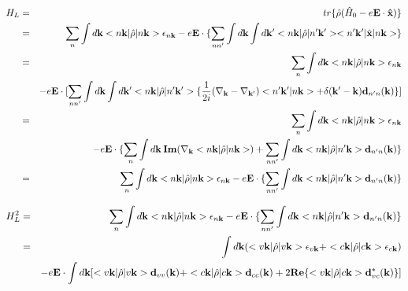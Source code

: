 \documentclass[aps,prb,preprint]{revtex4-1}
\begin{document}
\begin{appendix}
 \begin{eqnarray}
H_L &=& tr\{\hat{\rho}( \hat{H}_0 -e{\bf E \cdot \hat{x}}) \} \nonumber \\
&=& \sum_n \int d{\bf k} <n{\bf k}| \hat{\rho} |n{\bf k}> \epsilon_{n{\bf k}} - e{\bf E} \cdot \{ \sum_{nn'} \int d{\bf k} \int d{\bf k'} <n{\bf k}| \hat{\rho} |n'{\bf k'}><n'{\bf k'}| \hat{\bf x} |n{\bf k}> \} \nonumber \\
&=& \sum_n \int d{\bf k} <n{\bf k}| \hat{\rho} |n{\bf k}> \epsilon_{n{\bf k}} \nonumber \\
&& - e{\bf E} \cdot [ \sum_{nn'} \int d{\bf k} \int d{\bf k'} <n{\bf k}| \hat{\rho} |n'{\bf k'}> \{ \frac{1}{2i}(\nabla_{\bf k}-\nabla_{\bf k'}) <n'{\bf k'}|n{\bf k}> + \delta({\bf k'-k}) {\bf d}_{n'n}({\bf k})\} ]\nonumber \\
&=& \sum_n \int d{\bf k} <n{\bf k}| \hat{\rho} |n{\bf k}> \epsilon_{n{\bf k}} \nonumber \\
&& - e{\bf E} \cdot \{ \sum_{n} \int d{\bf k} \:{\bf Im}( \nabla_{\bf k}  <n{\bf k}| \hat{\rho} |n{\bf k}> ) + \sum_{nn'} \int d{\bf k} <n{\bf k}| \hat{\rho} |n'{\bf k}> {\bf d}_{n'n}({\bf k})\} \nonumber \\
&=& \sum_n \int d{\bf k} <n{\bf k}| \hat{\rho} |n{\bf k}> \epsilon_{n{\bf k}} - e{\bf E} \cdot \{ \sum_{nn'} \int d{\bf k} <n{\bf k}| \hat{\rho} |n'{\bf k}> {\bf d}_{n'n}({\bf k})\} 
\end{eqnarray}

 \begin{eqnarray}
H_L^2 &=& \sum_n \int d{\bf k} <n{\bf k}| \hat{\rho} |n{\bf k}> \epsilon_{n{\bf k}} - e{\bf E} \cdot \{ \sum_{nn'} \int d{\bf k} <n{\bf k}| \hat{\rho} |n'{\bf k}> {\bf d}_{n'n}({\bf k})\} \nonumber \\
&=&  \int d{\bf k} ( <v{\bf k}| \hat{\rho} |v{\bf k}> \epsilon_{v{\bf k}} + <c{\bf k}| \hat{\rho} |c{\bf k}> \epsilon_{c{\bf k}} ) \nonumber \\
&& - e{\bf E} \cdot  \int d{\bf k} [ <v{\bf k}| \hat{\rho} |v{\bf k}> {\bf d}_{vv}({\bf k}) + <c{\bf k}| \hat{\rho} |c{\bf k}> {\bf d}_{cc}({\bf k}) + 2{\bf Re}\{ <v{\bf k}| \hat{\rho} |c{\bf k}> {\bf d}_{vc}^*({\bf k}) \} ]   \nonumber \\
\end{eqnarray}


\end{appendix}
\end{document}
